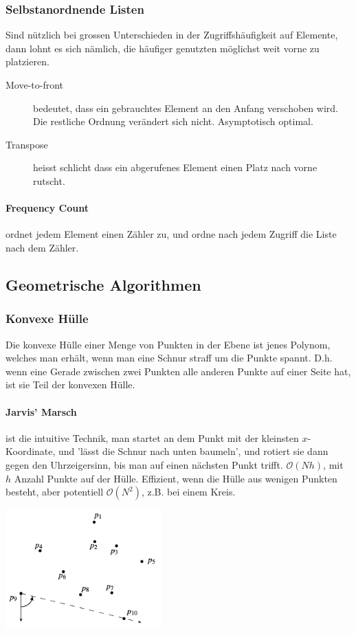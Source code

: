 \documentclass[a4paper, 9pt, DIV=20]{scrartcl}
\newcommand{\Oh}{\mathcal{O}}
\begin{document}
\subsubsection{Selbstanordnende Listen}
Sind nützlich bei grossen Unterschieden in der Zugriffshäufigkeit auf Elemente, dann lohnt es sich nämlich, die häufiger genutzten möglichst weit vorne zu platzieren.
\begin{description}
\item[Move-to-front] bedeutet, dass ein gebrauchtes Element an den Anfang verschoben wird. Die restliche Ordnung verändert sich nicht. Asymptotisch optimal.
\item[Transpose] heisst schlicht dass ein abgerufenes Element einen Platz nach vorne rutscht.
\end{description}

\paragraph{Frequency Count} ordnet jedem Element einen Zähler zu, und ordne nach jedem Zugriff die Liste nach dem Zähler.

\subsection{Geometrische Algorithmen}
\subsubsection{Konvexe Hülle}
Die konvexe Hülle einer Menge von Punkten in der Ebene ist jenes Polynom, welches man erhält, wenn man eine Schnur straff um die Punkte spannt. D.h. wenn eine Gerade zwischen zwei Punkten alle anderen Punkte auf einer Seite hat, ist sie Teil der konvexen Hülle.

\paragraph{Jarvis' Marsch} ist die intuitive Technik, man startet an dem Punkt mit der kleinsten $x$-Koordinate, und 'lässt die Schnur nach unten baumeln', und rotiert sie dann gegen den Uhrzeigersinn, bis man auf einen nächsten Punkt trifft. $\Oh(Nh)$, mit $h$ Anzahl Punkte auf der Hülle. Effizient, wenn die Hülle aus wenigen Punkten besteht, aber potentiell $\Oh(N^{2})$, z.B. bei einem Kreis.

\begin{center}
\includegraphics[width=6cm]{JarvisMarch}
\end{center}
\end{document}
